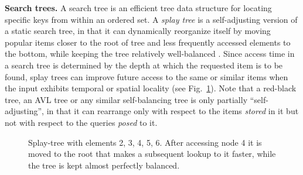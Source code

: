 \noindent%
\textbf{Search trees.} %
A search tree is an efficient tree data structure for locating specific keys from within an ordered set. A \emph{splay tree} is a self-adjusting version of a static search tree, in that it can dynamically reorganize itself by moving popular items closer to the root of tree and less frequently accessed elements to the bottom, while keeping the tree relatively well-balanced \cite{SleatorT85Splay, BoseDL08, Avin0020}. Since access time in a search tree is determined by the depth at which the requested item is to be found, splay trees can improve future access to the same or similar items when the input exhibits temporal or spatial locality (see Fig.~\ref{fig:bst_root_3}).  Note that a red-black tree, an AVL tree or any similar self-balancing tree is only partially ``self-adjusting'', in that it can rearrange only with respect to the items \emph{stored} in it but not with respect to the queries \emph{posed} to it.

\begin{figure}
 \centering
 \caption{Splay-tree with elements 2, 3, 4, 5, 6. After accessing node 4 it is moved to the root that makes a subsequent lookup to it faster, while the tree is kept almost perfectly balanced.}
 \label{fig:bst_root_3}
\end{figure}

